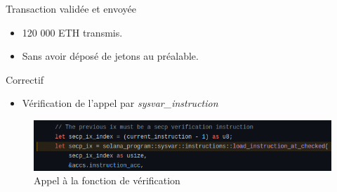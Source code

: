 \begin{frame}
    \begin{block}{Transaction validée et envoyée}
        \begin{itemize}
            \item 120 000 ETH transmis.
            \item Sans avoir déposé de jetons au préalable.
        \end{itemize}
    \end{block}
\end{frame}

\begin{frame}{Correctif}
    \begin{itemize}
        \item Vérification de l'appel par \textit{sysvar\_instruction}
    \end{itemize}
    \begin{figure}
        \centering
        \includegraphics[scale = 0.3]{centralisation/img/worm_fixed.png}
        \caption{Appel à la fonction de vérification}
    \end{figure}
\end{frame}